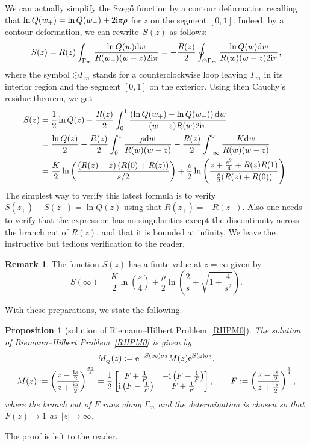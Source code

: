 \documentclass[pdftex]{sigma}
\numberwithin{equation}{section}
\newtheorem{Proposition}[Theorem]{Proposition}
\theoremstyle{definition}
\newtheorem{Remark}[Theorem]{Remark}
\def\red#1{\textcolor[rgb]{0.9, 0, 0}{#1} }
\def\le{\left}
\def\ri{\right}
\def \d{{\mathrm d}}
\def\s{\sigma}
\begin{document}
We can actually simplify the Szeg\H{o} function by a contour deformation recalling that $\ln Q(w_+)\allowbreak= \ln Q(w_-) + 2{\rm i}\pi { {\rho}}$ for $z$ on the segment $[0,1]$. Indeed, by a contour deformation, we can rewrite~$S(z)$ as follows:
\[
S(z) = R(z) \int_{\Gamma_m} \frac {\ln Q(w) \d w} {R(w_+) (w-z) 2{\rm i}\pi}
= - \frac{R(z)}2 \oint_{\odot \Gamma_m} \frac {\ln Q(w) \d w} {R(w) (w-z) 2{\rm i}\pi},
\]
where the symbol $\odot \Gamma_m$ stands for a counterclockwise loop leaving $\Gamma_m$ in its interior region and the segment $[0,1]$ on the exterior. Using then Cauchy's residue theorem, we get
\begin{align}
S(z) ={}& \frac 1 2 \ln Q(z) - \frac {R(z)}2 \int_0^1 \frac {\le(\ln Q(w_+)- \ln Q(w_-)\ri)\d w}{(w-z)R(w) 2{\rm i}\pi}\nonumber
\\
={}& \frac {\ln Q(z)}2 - \frac{R(z)}2\int_0^1 \frac {{ {\rho}} \d w}{R(w)(w-z)}
- \frac{R(z)}2\int_{-\infty}^0 \frac {{ {K}} \d w}{R(w)(w-z)}
\nonumber
\\={}&
\frac{ {K}}2
\ln\le(\frac {\le (R(z)-z\ri)\le(R(0)+ R(z) \ri)}{s/2}\ri)
+
\frac{ {\rho}}2 \ln\le(
 {\frac { z+ \frac {s^2}4 + R(z) R(1) }{ \frac s2 (R(z) + R(0)
 ) }}
 \ri).
 \label{S(z)}
\end{align}
The simplest way to verify this latest formula is to verify $S(z_+)+S(z_-)=\ln Q(z)$ using that $R(z_+)=-R(z_-)$. Also one needs to verify that the expression has no singularities except the discontinuity across the branch cut of $R(z)$, and that it is bounded at infinity. We leave the instructive but tedious verification to the reader.
\begin{Remark}
The function $S(z)$ has a finite value at $z=\infty$ given by
\[
S(\infty) = \frac { {K}} 2 \ln \le(\frac s4 \ri) + \frac { {\rho}} 2 \ln \le(\frac 2 s + \sqrt{1 + \frac 4{s^2}} \ri).
\]
\end{Remark}
With these preparations, we state the following.

\begin{Proposition}[solution of Riemann--Hilbert Problem~\ref{RHPM0}]
\label{modelMg0}
The solution of Riemann--Hilbert Problem~{\rm\ref{RHPM0}} is given by
\begin{gather}
M_{_Q}(z) := {\rm e}^{-S(\infty)\s_3} M(z) {\rm e}^{S(z) \s_3},\label{defMQ}\\
M(z):= \le(\frac {z-\frac {{\rm i}s}2}{z+\frac {{\rm i}s}2}\ri)^{\frac {\s_2}4}
= \frac 1 2\begin{bmatrix}
{F} + \frac 1 {F} & -{\rm i}\le({F}-\frac 1 {F}\ri)\\
{\rm i}\le({F} - \frac 1 {F}\ri) & {F} + \frac 1 {F}
\end{bmatrix},
\qquad
{F} := \le(\frac {z-\frac {{\rm i}s}2}{z+ \frac {{\rm i}s}2} \ri)^\frac 14,\nonumber
\end{gather}
where the branch cut of ${F}$ runs along $\Gamma_m$ and the determination is chosen so that ${F}(z) \to 1 $ as~${|z|\to \infty}$.
\end{Proposition}
The proof is left to the reader.
\end{document}

